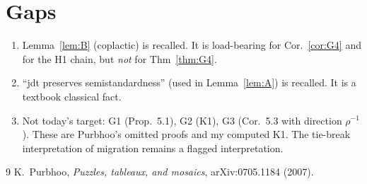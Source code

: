 \documentclass[11pt]{article}
\theoremstyle{definition}
\begin{document}
\section{Gaps}
\begin{enumerate}
\item Lemma~\ref{lem:B} (coplactic) is recalled. It is load-bearing for Cor.~\ref{cor:G4} and for the H1 chain, but
\emph{not} for Thm~\ref{thm:G4}.
\item ``jdt preserves semistandardness'' (used in Lemma~\ref{lem:A}) is recalled. It is a textbook classical fact.
\item Not today's target: G1 (Prop.~5.1), G2 (K1), G3 (Cor.~5.3 with direction $\rho^{-1}$). These are Purbhoo's omitted
proofs and my computed K1. The tie-break interpretation of migration remains a flagged interpretation.
\end{enumerate}

\begin{thebibliography}{9}
 K.~Purbhoo, \emph{Puzzles, tableaux, and mosaics}, arXiv:0705.1184 (2007).
\end{thebibliography}
\end{document}
